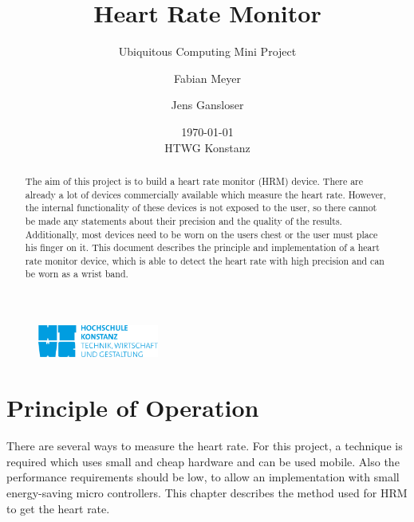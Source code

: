 \documentclass[notitlepage]{scrreprt}
\begin{document}
\title{Heart Rate Monitor}
\subtitle{Ubiquitous Computing Mini Project}
\author{Fabian Meyer \and Jens Gansloser}
\date{\today \\ HTWG Konstanz}
\maketitle
\thispagestyle{empty}

\begin{figure}[H]
	\centering
	\includegraphics[width=150px]{images/htwgLogo.jpg}
\end{figure}

\begin{abstract}
The aim of this project is to build a heart rate monitor (HRM) device. There are already a lot of devices commercially available which measure the heart rate. However, the internal functionality of these devices is not exposed to the user, so there cannot be made any statements about their precision and the quality of the results. Additionally, most devices need to be worn on the users chest or the user must place his finger on it. This document describes the principle and implementation of a heart rate monitor device, which is able to detect the heart rate with high precision and can be worn as a wrist band.
\end{abstract}
\clearpage

\tableofcontents

\chapter{Principle of Operation}
\label{chap:principle-of-operation}

There are several ways to measure the heart rate. For this project, a technique is required which uses small and cheap hardware and can be used mobile. Also the performance requirements should be low, to allow an implementation with small energy-saving micro controllers. This chapter describes the method used for HRM to get the heart rate.
\end{document}
